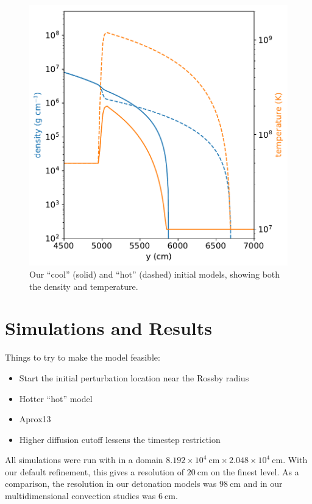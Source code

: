 \documentclass[twocolumn,times,tighten]{aastex62}
\begin{document}
\begin{figure}[t]
\centering
\includegraphics[width=\linewidth]{initial_model_paper}
\caption{\label{fig:initial_models} Our ``cool'' (solid) and ``hot''
  (dashed) initial models, showing both the density and temperature.}
\end{figure}



\section{Simulations and Results}\label{Sec:results}

Things to try to make the model feasible:
\begin{itemize}
\item Start the initial perturbation location near the Rossby radius
\item Hotter ``hot'' model
\item Aprox13
\item Higher diffusion cutoff lessens the timestep restriction
\end{itemize}


All simulations were run with in a domain $8.192\times
10^4~\mathrm{cm} \times 2.048\times 10^4~\mathrm{cm}$.  With our
default refinement, this gives a resolution of $20~\mathrm{cm}$ on the
finest level.  As a comparison, the resolution in our detonation
models was $98~\mathrm{cm}$ and in our multidimensional convection
studies was $6~\mathrm{cm}$.
\end{document}
